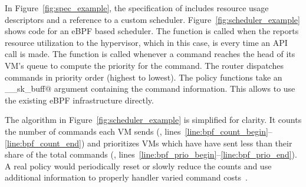 {In Figure~\ref{fig:spec_example}, the specification of %
\spec@cuLaunchKernel@ includes resource usage descriptors and a reference to a custom scheduler.
Figure~\ref{fig:scheduler_example} shows code for an eBPF based scheduler.
The \spec@consume@ function is called when the \worker reports resource utilization to the hypervisor, which
in this case, is every time an API call is made.
The \spec@schedule@ function is called whenever a command reaches the head of its VM's queue to compute the priority for the command.
The router dispatches commands in priority order (highest to lowest).
The \AvA policy functions take an \spec@__sk_buff@ argument containing the \AvA command information.
This allows \AvA to use the existing eBPF infrastructure directly.

The algorithm in Figure~\ref{fig:scheduler_example} is simplified for clarity.
It counts the number of commands each VM sends (\spec@consume@, lines~\ref{line:bpf_count_begin}--\ref{line:bpf_count_end}) and prioritizes VMs which have have sent less than their share of the total commands (\spec@schedule@, lines~\ref{line:bpf_prio_begin}--\ref{line:bpf_prio_end}).
A real policy would periodically reset or slowly reduce the counts and use additional information to properly handler varied command costs~\cite{sched_survey,rossbach2011ptask,aimd}.



\endgroup

